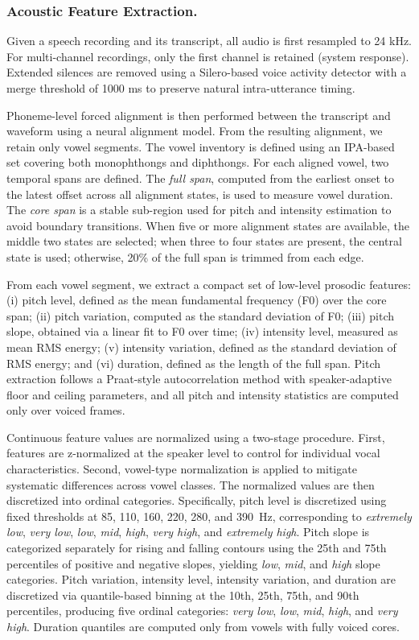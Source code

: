 \subsubsection{Acoustic Feature Extraction.}
\label{app:acoustic_features}

Given a speech recording and its transcript, all audio is first resampled to 24 kHz. For multi-channel recordings, only the first channel is retained (system response). Extended silences are removed using a Silero-based voice activity detector with a merge threshold of 1000 ms to preserve natural intra-utterance timing.

Phoneme-level forced alignment is then performed between the transcript and waveform using a neural alignment model. From the resulting alignment, we retain only vowel segments. The vowel inventory is defined using an IPA-based set covering both monophthongs and diphthongs. For each aligned vowel, two temporal spans are defined. The \emph{full span}, computed from the earliest onset to the latest offset across all alignment states, is used to measure vowel duration. The \emph{core span} is a stable sub-region used for pitch and intensity estimation to avoid boundary transitions. When five or more alignment states are available, the middle two states are selected; when three to four states are present, the central state is used; otherwise, 20\% of the full span is trimmed from each edge.

From each vowel segment, we extract a compact set of low-level prosodic features: (i) pitch level, defined as the mean fundamental frequency (F0) over the core span; (ii) pitch variation, computed as the standard deviation of F0; (iii) pitch slope, obtained via a linear fit to F0 over time; (iv) intensity level, measured as mean RMS energy; (v) intensity variation, defined as the standard deviation of RMS energy; and (vi) duration, defined as the length of the full span. Pitch extraction follows a Praat-style autocorrelation method with speaker-adaptive floor and ceiling parameters, and all pitch and intensity statistics are computed only over voiced frames.

Continuous feature values are normalized using a two-stage procedure. First, features are z-normalized at the speaker level to control for individual vocal characteristics. Second, vowel-type normalization is applied to mitigate systematic differences across vowel classes. The normalized values are then discretized into ordinal categories. Specifically, pitch level is discretized using fixed thresholds at 85, 110, 160, 220, 280, and 390~Hz, corresponding to \emph{extremely low}, \emph{very low}, \emph{low}, \emph{mid}, \emph{high}, \emph{very high}, and \emph{extremely high}. Pitch slope is categorized separately for rising and falling contours using the 25th and 75th percentiles of positive and negative slopes, yielding \emph{low}, \emph{mid}, and \emph{high} slope categories. Pitch variation, intensity level, intensity variation, and duration are discretized via quantile-based binning at the 10th, 25th, 75th, and 90th percentiles, producing five ordinal categories: \emph{very low}, \emph{low}, \emph{mid}, \emph{high}, and \emph{very high}. Duration quantiles are computed only from vowels with fully voiced cores.

